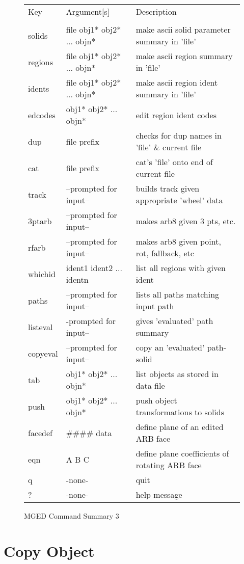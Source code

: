 \begin{figure}
\begin{tabular}{l l l}
Key	& Argument[s]	& Description \\
\\
  solids	& file obj1* obj2* ... objn*	& make ascii solid parameter summary in 'file' \\
  regions	& file obj1* obj2* ... objn*	& make ascii region summary in 'file' \\
  idents	& file obj1* obj2* ... objn*	& make ascii region ident summary in 'file' \\
  edcodes	& obj1* obj2* ... objn*	& edit region ident codes \\
  dup	& file {prefix}	& checks for dup names in 'file' \& current file \\
  cat	& file {prefix}	& cat's 'file' onto end of current file \\
  track	& --prompted for input--	& builds track given appropriate 'wheel' data \\
  3ptarb	& --prompted for input--	& makes arb8 given 3 pts, etc. \\
  rfarb	& --prompted for input--	& makes arb8 given point, rot, fallback, etc \\
  whichid	& ident1 ident2 ... identn	& list all regions with given ident \\
  paths	& --prompted for input--	& lists all paths matching input path \\
  listeval	& -prompted for input--	& gives 'evaluated' path summary \\
  copyeval	& --prompted for input--	& copy an 'evaluated' path-solid \\
  tab	& obj1* obj2* ... objn*	& list objects as stored in data file \\
  push	& obj1* obj2* ... objn*	& push object transformations to solids \\
  facedef	& \#\#\#\# {data}	& define plane of an edited ARB face \\
  eqn	& A B C	& define plane coefficients of rotating ARB face \\
  q	& -none-	& quit \\
  ?	& -none-	& help message \\
\end{tabular}
\caption{MGED Command Summary 3 }
\end{figure}

\section{Copy Object}

